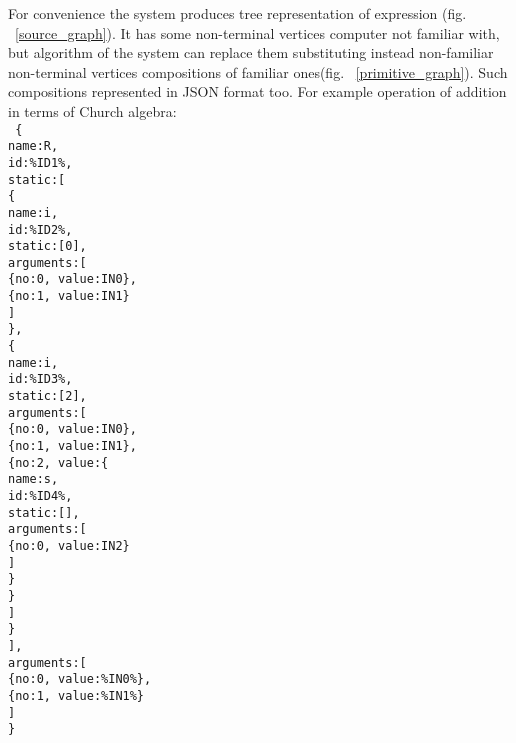 For convenience the system produces tree representation of expression  (fig. ~\ref{source_graph}). It has some non-terminal vertices computer not familiar with, but algorithm of the system can replace them substituting instead non-familiar non-terminal vertices compositions of familiar ones(fig. ~\ref{primitive_graph}). Such compositions represented in JSON format too. For example operation of addition in terms of Church algebra:\\
\texttt{
\{\\
\indent name:R,\\
\indent id:\%ID1\%,\\
\indent static:[\\
\indent \{\\
\indent \indent name:i,\\
\indent \indent id:\%ID2\%,\\
\indent \indent static:[0],\\
\indent \indent arguments:[\\
\indent \indent \indent \{no:0, value:IN0\},\\
\indent \indent \indent \{no:1, value:IN1\}\\
\indent \indent ]\\
\indent \},\\
\indent \{\\
\indent \indent name:i,\\
\indent \indent id:\%ID3\%,\\
\indent \indent static:[2],\\
\indent \indent arguments:[\\
\indent \indent \indent \{no:0, value:IN0\},\\
\indent \indent \indent \{no:1, value:IN1\},\\
\indent \indent \indent \{no:2, value:\{\\
\indent \indent \indent \indent name:s,\\
\indent \indent \indent \indent id:\%ID4\%,\\
\indent \indent \indent \indent static:[],\\
\indent \indent \indent \indent arguments:[\\
\indent \indent \indent \indent \indent \{no:0, value:IN2\}\\
\indent \indent \indent \indent ]\\
\indent \indent \indent \indent \}\\
\indent \indent \indent \}\\
\indent \indent ]\\
\indent \}\\
\indent ],\\
\indent arguments:[\\
\indent \indent \{no:0, value:\%IN0\%\},\\
\indent \indent \{no:1, value:\%IN1\%\}\\
\indent ] \\
\}\\
}
